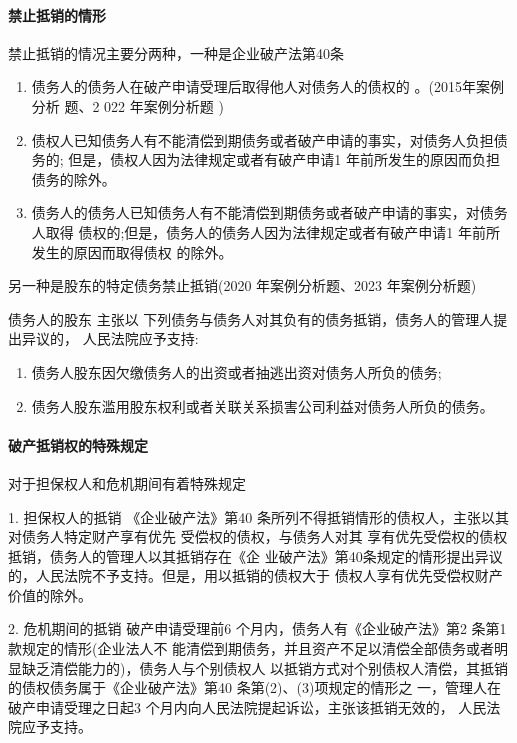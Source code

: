 \documentclass[UTF8,12pt]{ctexart}
\numberwithin{equation}{section} %
\numberwithin{figure}{section}
\numberwithin{table}{section}
\begin{document}
	\paragraph{禁止抵销的情形}
	禁止抵销的情况主要分两种，一种是企业破产法第40条
	\begin{enumerate}
		\item 债务人的债务人在破产申请受理后取得他人对债务人的债权的 。(2015年案例分析 题、2 022 年案例分析题 )
		
		\item 债权人已知债务人有不能清偿到期债务或者破产申请的事实，对债务人负担债务的; 但是，债权人因为法律规定或者有破产申请1 年前所发生的原因而负担债务的除外。
		
		\item 债务人的债务人已知债务人有不能清偿到期债务或者破产申请的事实，对债务人取得 债权的;但是，债务人的债务人因为法律规定或者有破产申请1 年前所发生的原因而取得债权 的除外。
	\end{enumerate}
	
	另一种是股东的特定债务禁止抵销(2020 年案例分析题、2023 年案例分析题)
	
	债务人的股东 主张以 下列债务与债务人对其负有的债务抵销，债务人的管理人提出异议的， 人民法院应予支持:
	\begin{enumerate}
		\item 债务人股东因欠缴债务人的出资或者抽逃出资对债务人所负的债务;
		
		\item 债务人股东滥用股东权利或者关联关系损害公司利益对债务人所负的债务。
	\end{enumerate}
	
	\paragraph{破产抵销权的特殊规定}
	对于担保权人和危机期间有着特殊规定
	
	1. 担保权人的抵销
	《企业破产法》第40 条所列不得抵销情形的债权人，主张以其对债务人特定财产享有优先 受偿权的债权，与债务人对其 享有优先受偿权的债权抵销，债务人的管理人以其抵销存在《企 业破产法》第40条规定的情形提出异议的，人民法院不予支持。但是，用以抵销的债权大于 债权人享有优先受偿权财产价值的除外。
	
	2. 危机期间的抵销
	破产申请受理前6 个月内，债务人有《企业破产法》第2 条第1款规定的情形(企业法人不 能清偿到期债务，并且资产不足以清偿全部债务或者明显缺乏清偿能力的)，债务人与个别债权人 以抵销方式对个别债权人清偿，其抵销的债权债务属于《企业破产法》第40 条第(2)、(3)项规定的情形之 一，管理人在破产申请受理之日起3 个月内向人民法院提起诉讼，主张该抵销无效的， 人民法院应予支持。
	
\end{document}
